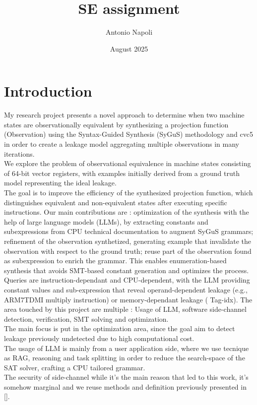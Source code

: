 \documentclass[12pt]{article}
\title{SE assignment}
\author{Antonio Napoli}
\date{August 2025}
\begin{document}
\maketitle

\section{Introduction}
My research project presents a novel approach to determine when two machine states are observationally equivalent by synthesizing a projection function (Observation) using the Syntax-Guided Synthesis (SyGuS) methodology and cvc5 in order to create a leakage model aggregating multiple observations in many iterations.\\
We explore the problem of observational equivalence in machine states consisting of 64-bit vector registers, with examples initially derived from a ground truth model representing the ideal leakage.\\
The goal is to improve the efficiency of the synthesized projection function, which distinguishes equivalent and non-equivalent states after executing specific instructions. Our main contributions are : optimization of the synthesis with the help of large language models (LLMs), by extracting constants and subexpressions from CPU technical documentation to augment SyGuS grammars; refinement of the observation synthetized, generating example that invalidate the observation with respect to the ground truth; reuse part of the observation found as subexpression to enrich the grammar.  This enables enumeration-based synthesis that avoids SMT-based constant generation and optimizes the process. Queries are instruction-dependant and CPU-dependent, with the LLM providing constant values and sub-expression that reveal operand-dependent leakage (e.g., ARM7TDMI multiply instruction) or memory-dependant leakage ( Tag-idx).
The area touched by this project are multiple : Usage of LLM, software side-channel detection, verification, SMT solving and optimization. \\
The main focus is put in the optimization area, since the goal aim to detect leakage previously undetected due to high computational cost. \\ 
The usage of LLM is mainly from a user application side, where we use tecnique as RAG, reasoning and task splitting in order to reduce the search-space of the SAT solver, crafting a CPU tailored grammar.\\
The security of side-channel while it's the main reason that led to this work, it's somehow marginal and we reuse methods and definition previously presented in [].
\end{document}
